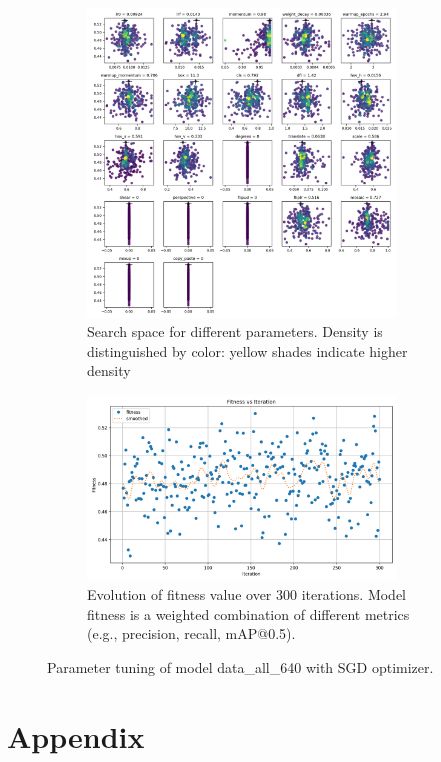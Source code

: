 \documentclass[Master,MDS,english]{BASE/twbook} %
\begin{document}
\begin{figure}
\centering
\begin{subfigure}{.5\textwidth}
  \centering
  \includegraphics[width=0.9\textwidth]{images/yolo/all/sgd/tune_scatter_plots}
  \caption{Search space for different parameters. Density is distinguished by color: yellow shades indicate higher density}
\end{subfigure}%
\begin{subfigure}{.5\textwidth}
  \centering
  \includegraphics[width=0.9\textwidth]{images/yolo/all/sgd/tune_fitness}
  \caption{Evolution of fitness value over 300 iterations. Model fitness is a weighted combination of different metrics (e.g., precision, recall, mAP@0.5).}
  \label{fig:images_from_videos}
\end{subfigure}
\caption{Parameter tuning of model data\_all\_640 with SGD optimizer. \\ }
\label{fig:yolo_tune_all_sgd}
\end{figure}

\clearpage
\chapter{Appendix}
\end{document}
